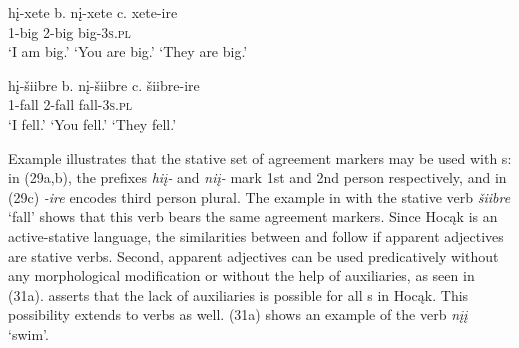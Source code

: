 \documentclass[output=paper]{LSP/langsci}
\begin{document}
\begin{exe}
\ex\label{ex:rosen:29}
\begin{xlist}
\ex \gll
hį-xete \hspace{36pt} b. {}  nį-xete \hspace{48pt} c. {} xete-ire\\
1-big {} {} {} 2-big {} {}  {} big-\textsc{3s.pl}\\
\glt `I am big.' \hspace{1.2cm} `You are big.' \hspace{1.1cm} `They are big.'

\end{xlist}
\end{exe}

\begin{exe}
\ex\label{ex:rosen:30}
\begin{xlist}
\ex \gll
hį-šiibre \hspace{30pt}  b. {} nį-šiibre \hspace{43pt} c. {} šiibre-ire\\
1-fall {} {} {} 2-fall {} {} {} fall-\textsc{3s.pl}\\
\glt `I fell.' \hspace{1.8cm} `You fell.'  \hspace{1.8cm} `They fell.'


\end{xlist}
\end{exe}

Example  illustrates that the stative set of agreement markers may be used with s: in (29a,b), the prefixes \textit{hiį-} and \textit{niį-} mark 1st and 2nd person respectively, and in (29c) \textit{-ire} encodes third person plural. The example in  with the stative verb \textit{šiibre} `fall' shows that this verb bears the same agreement markers. Since Hocąk is an active-stative language, the similarities between  and  follow if apparent adjectives are stative verbs. Second, apparent adjectives can be used predicatively without any morphological modification or without the help of auxiliaries, as seen in (31a). \citet{Helmbrecht2006b} asserts that the lack of auxiliaries is possible for all s in Hocąk. This possibility extends to verbs as well. (31a) shows an example of the verb \textit{nįį} `swim'.
\end{document}
